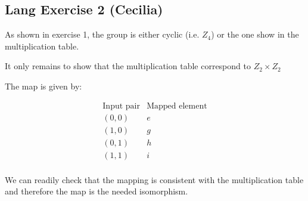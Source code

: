 \subsection*{Lang Exercise 2 (Cecilia)}

As shown in exercise 1, the group is either cyclic (i.e. $Z_4$) or the one show in the multiplication table.

It only remains to show that the multiplication table correspond to $Z_2 \times Z_2$

The map is given by:

\[
\begin{array}{c|c}
\text{Input pair} & \text{Mapped element} \\
\hline
(0,0) & e \\
(1,0) & g \\
(0,1) & h \\
(1,1) & i \\
\end{array}
\]

We can readily check that the mapping is consistent with the multiplication table and therefore the map is the needed isomorphism.